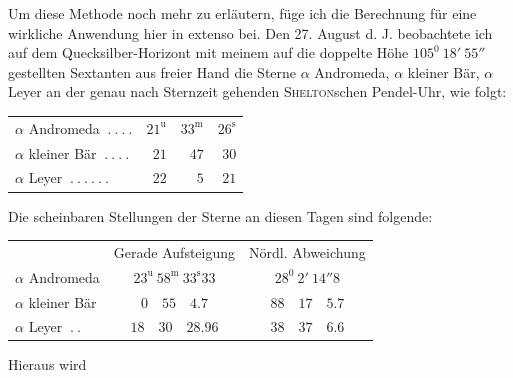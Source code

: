 Um diese Methode noch mehr zu erläutern, füge ich die Berechnung für
eine wirkliche Anwendung hier in extenso bei. Den 27. August d. J. beobachtete
ich auf dem Quecksilber-Horizont mit meinem auf die doppelte Höhe
$105^0\ 18'\ 55''$ gestellten Sextanten aus freier Hand die Sterne $\alpha$ Andromeda,
$\alpha$ kleiner Bär, $\alpha$ Leyer an der genau nach Sternzeit gehenden \textsc{Shelton}schen
Pendel-Uhr, wie folgt:
\begin{center}
\begin{tabular}{lrrr}
$\alpha$ Andromeda $\ .\ .\ .\ .$&$21^{\mathrm u}$&$33^{\mathrm m}$&$26^{\mathrm s}$\\
$\alpha$ kleiner Bär $\ .\ .\ .\ .$&$21$&$47$&$30$\\
$\alpha$ Leyer $\ .\ .\ .\ .\ .\ .$&$22$&$5$&$21$
\end{tabular}
\end{center}
Die scheinbaren Stellungen der Sterne an diesen Tagen sind folgende:
\begin{center}
\small
\begin{tabular}{lcc}
&Gerade Aufsteigung&Nördl. Abweichung\\
$\alpha$ Andromeda&$23^{\mathrm u}\ 58^{\mathrm m}\ 33^{\mathrm s}33$&$28^0\ 2'\ 14''8$\\
$\alpha$ kleiner Bär&$0\quad55\quad4.7$&$88\quad17\quad5.7$\\
$\alpha$ Leyer $\ .\ .$&$18\quad30\quad28.96$&$38\quad37\quad6.6$
\end{tabular}
\end{center}
Hieraus wird
%
